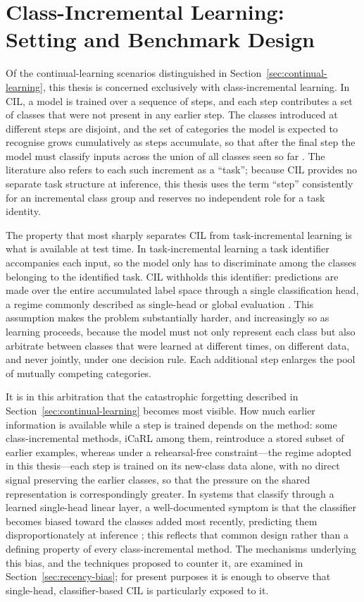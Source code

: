 \section{Class-Incremental Learning: Setting and Benchmark Design}
\label{sec:cil}

Of the continual-learning scenarios distinguished in Section~\ref{sec:continual-learning}, this
thesis is concerned exclusively with class-incremental learning. In CIL, a
model is trained over a sequence of steps, and each step contributes a set
of classes that were not present in any earlier step. The classes
introduced at different steps are disjoint, and the set of categories the
model is expected to recognise grows cumulatively as steps accumulate, so
that after the final step the model must classify inputs across the union
of all classes seen so far \parencite{masana2020classincremental}. The literature also
refers to each such increment as a \enquote{task}; because CIL provides no separate
task structure at inference, this thesis uses the term \enquote{step} consistently
for an incremental class group and reserves no independent role for a task
identity.

The property that most sharply separates CIL from task-incremental learning
is what is available at test time. In task-incremental learning a task
identifier accompanies each input, so the model only has to discriminate
among the classes belonging to the identified task. CIL withholds this
identifier: predictions are made over the entire accumulated label space
through a single classification head, a regime commonly described as
single-head or global evaluation \parencite{masana2020classincremental,delange2022continual}. This
assumption makes the problem substantially harder, and increasingly so as
learning proceeds, because the model must not only represent each class but
also arbitrate between classes that were learned at different times, on
different data, and never jointly, under one decision rule. Each additional
step enlarges the pool of mutually competing categories.

It is in this arbitration that the catastrophic forgetting described in
Section~\ref{sec:continual-learning} becomes most visible. How much earlier information is available
while a step is trained depends on the method: some class-incremental
methods, iCaRL among them, reintroduce a stored subset of earlier examples,
whereas under a rehearsal-free constraint---the regime adopted in this
thesis---each step is trained on its new-class data alone, with no direct
signal preserving the earlier classes, so that the pressure on the shared
representation is correspondingly greater. In systems that classify through
a learned single-head linear layer, a well-documented symptom is that the
classifier becomes biased toward the classes added most recently,
predicting them disproportionately at inference \parencite{masana2020classincremental}; this
reflects that common design rather than a defining property of every
class-incremental method. The mechanisms underlying this bias, and the
techniques proposed to counter it, are examined in Section~\ref{sec:recency-bias}; for present
purposes it is enough to observe that single-head, classifier-based CIL is
particularly exposed to it.

